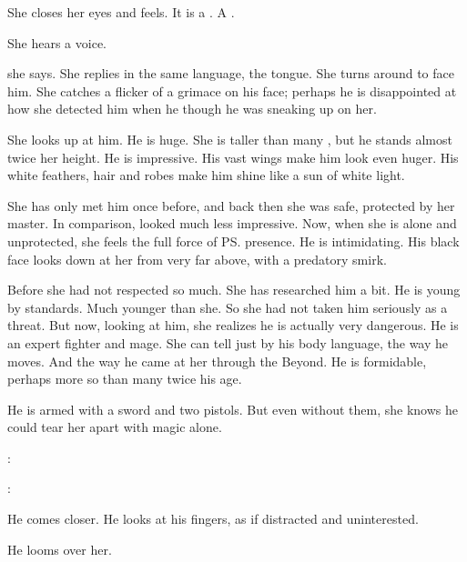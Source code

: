 She closes her eyes and feels.
It is a \resphan. 
A \ketheran. 

She hears a voice.

 she says. 
She replies in the same language, the \resphan tongue.
She turns around to face him. 
She catches a flicker of a grimace on his face; perhaps he is disappointed at how she detected him when he though he was sneaking up on her. 

She looks up at him. 
He is huge. 
She is taller than many \scathae, but he stands almost twice her height. 
He is impressive. 
His vast wings make him look even huger. 
His white feathers, hair and robes make him shine like a sun of white light. 

She has only met him once before, and back then she was safe, protected by her master. 
In comparison, \Teshrial looked much less impressive. 
Now, when she is alone and unprotected, she feels the full force of \ps{\Teshrial} presence. 
He is intimidating. 
His black face looks down at her from very far above, with a predatory smirk. 

Before she had not respected \Teshrial so much. 
She has researched him a bit. 
He is young by \resphan standards. 
Much younger than she.
So she had not taken him seriously as a threat. 
But now, looking at him, she realizes he is actually very dangerous. 
He is an expert fighter and mage. 
She can tell just by his body language, the way he moves.
And the way he came at her through the Beyond. 
He is formidable, perhaps more so than many \resphain twice his age. 


He is armed with a \ruthil sword and two \ghijed pistols. 
But even without them, she knows he could tear her apart with magic alone. 

\Teshrial:

\Criseis:

He comes closer. 
He looks at his fingers, as if distracted and uninterested. 


He looms over her.

